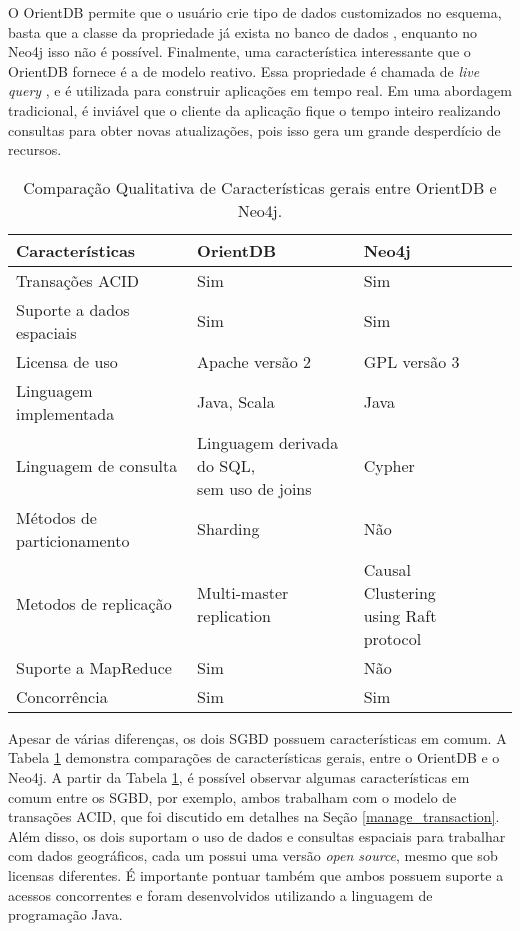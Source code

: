 	O OrientDB permite que o usuário crie tipo de dados customizados no esquema, basta que a classe da propriedade já exista no banco de dados \cite{orientdbcreateproperty}, enquanto no Neo4j isso não é possível. Finalmente, uma característica interessante que o OrientDB fornece é a de modelo reativo. Essa propriedade é chamada de \textit{live query} \cite{orientdblivequery}, e é utilizada para construir aplicações em tempo real. Em uma abordagem tradicional, é inviável que o cliente da aplicação fique o tempo inteiro realizando consultas para obter novas atualizações, pois isso gera um grande desperdício de recursos.
	
\begin{table}[H]
\centering
\caption{Comparação Qualitativa de Características gerais entre OrientDB e Neo4j.}
\begin{tabular}{|l|l|l|l|l|}
\hline
Características                       & OrientDB                                    & Neo4j \\ \hline
Transações ACID            & Sim                                         & Sim \\ \hline
Suporte a dados espaciais  & Sim                                         & Sim \\ \hline
Licensa de uso             & Apache versão 2                             & GPL versão 3 \\ \hline
Linguagem implementada     & Java, Scala                                 & Java \\ \hline
Linguagem de consulta      & \makecell{Linguagem derivada do SQL,\\ sem uso de joins} & Cypher \\ \hline
Métodos de particionamento & Sharding                                    & Não \\ \hline
Metodos de replicação      & Multi-master replication                    & \makecell{Causal Clustering \\ using Raft protocol} \\ \hline
Suporte a MapReduce        & Sim                                         & Não \\ \hline
Concorrência               & Sim                                         & Sim \\ \hline
\end{tabular}
\label{table:2}
\end{table}
	
	Apesar de várias diferenças, os dois SGBD possuem características em comum. A Tabela \ref{table:2} demonstra comparações de características gerais, entre o OrientDB e o Neo4j. A partir da Tabela \ref{table:2}, é possível observar algumas características em comum entre os SGBD, por exemplo, ambos trabalham com o modelo de transações ACID, que foi discutido em detalhes na Seção \ref{manage_transaction}. Além disso, os dois suportam o uso de dados e consultas espaciais para trabalhar com dados geográficos, cada um possui uma versão \textit{open source}, mesmo que sob licensas diferentes. É importante pontuar também que ambos possuem suporte a acessos concorrentes e foram desenvolvidos utilizando a linguagem de programação Java.
	
